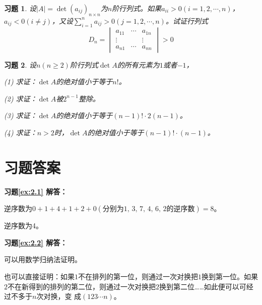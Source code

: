 \documentclass[a4paper]{book}
\newtheorem{ex}{习题}[chapter]
\newcommand{\enum}{\begin{list}{}{\setlength{\leftmargin}{0pt} \setlength{\itemindent}{2.5em} \setlength{\listparindent}{2em}}}
\begin{document}
\begin{ex} \label{ex:2.23}
设$|A| = \det (a_{ij})_{n\times n}$为$n$阶行列式。如果$a_{ii}>0 (i = 1,2,\cdots,n)$，$a_{ij}<0 (i\neq j)$，又设$\sum\limits_{i=1}^n a_{ij} > 0 (j = 1,2,\cdots,n)$。试证行列式
$$D_n = \begin{vmatrix} a_{11} & \cdots & a_{1n} \\ \vdots & & \vdots \\ a_{n1} & \cdots & a_{nn} \end{vmatrix} > 0$$
\end{ex}

\begin{ex} \label{ex:2.24}
设$n(n \geqslant 2)$阶行列式$\det A$的所有元素为$1$或者$-1$，

\enum
\item[(1)] 求证：$\det A$的绝对值小于等于$n!$。
\item[(2)] 求证：$\det A$被$2^{n-1}$整除。
\item[(3)] 求证：$\det A$的绝对值小于等于$(n-1)!\cdot2(n-1)$。
\item[(4)] 求证：$n > 2$时，$\det A$的绝对值小于等于$(n-1)!\cdot(n-1)$。
\end{list}
\end{ex}

\newpage


\section{习题答案}

\textbf{习题\ref{ex:2.1} 解答：}

\enum
\item[(1)] 逆序数为$0 + 1 + 4 + 1 + 2 + 0 (\text{分别为1, 3, 7, 4, 6, 2的逆序数})= 8$。

\item[(2)] 逆序数为4。
\end{list}

\vspace{1.5em}

\textbf{习题\ref{ex:2.2} 解答：}

可以用数学归纳法证明。

也可以直接证明：如果$1$不在排列的第一位，则通过一次对换把$1$换到第一位。如果$2$不在新得到的排列的第二位，则通过一次对换把$2$换到第二位……如此便可以可经过不多于$n$次对换，变
成$(123\cdots n)$。

\vspace{1.5em}
\end{document}
